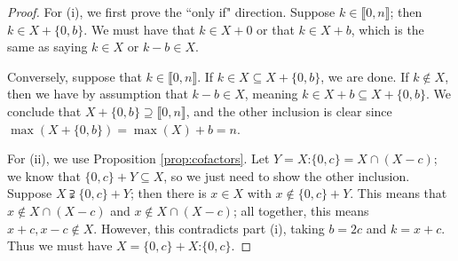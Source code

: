 \documentclass{report}
\newcommand{\llb}{\llbracket}
\newcommand{\rrb}{\rrbracket}
\renewcommand{\:}{\text{:}}
\theoremstyle{definition}
\begin{document}
\begin{proof}
For (i), we first prove the ``only if" direction.  
Suppose $k\in \llb 0,n \rrb$; then $k\in X + \{0,b\}$.
We must have that $k\in X + 0$ or that $k \in X + b$, which is the same as saying $k\in X$ or $k-b\in X$.

Conversely, suppose that $k\in \llb 0,n \rrb$.
If $k\in X \subseteq X + \{0,b\}$, we are done.
If $k\notin X$, then we have by assumption that $k-b\in X$, meaning $k\in X +b \subseteq X+ \{0,b\}$.
We conclude that $X + \{0,b\} \supseteq \llb 0,n \rrb$, and the other inclusion is clear since $\max(X+\{0,b\}) = \max(X) + b = n$.

For (ii), we use Proposition \ref{prop:cofactors}.
Let $Y = X\:\{0,c\} = X\cap (X-c)$; we know that $\{0,c\} + Y \subseteq X$, so we just need to show the other inclusion.
Suppose $X \supsetneqq \{0,c\} + Y$; then there is $x\in X$ with $x\notin \{0,c\} + Y$.
This means that $x\notin X \cap (X-c)$ and $x \notin X \cap (X-c)$; all together, this means $x+c,x-c\notin X$.
However, this contradicts part (i), taking $b = 2c$ and $k = x+c$.
Thus we must have $X = \{0,c\} + X\:\{0,c\}$.
\end{proof}
\end{document}
